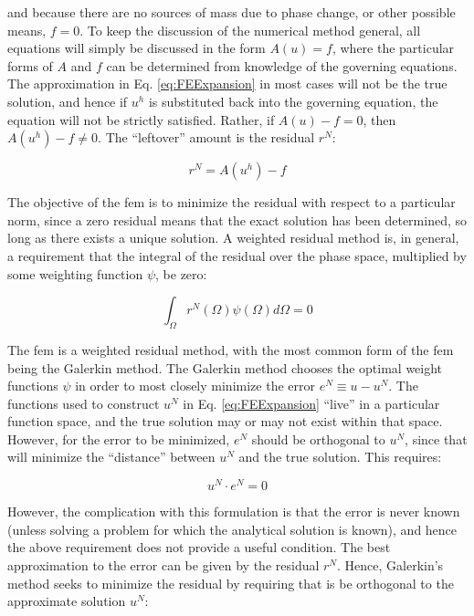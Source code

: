 \documentclass[10pt]{article}
\numberwithin{equation}{section} %
\begin{document}
and because there are no sources of mass due to phase change, or other possible means, \(f=0\). To keep the discussion of the numerical method general, all equations will simply be discussed in the form \(A(u)=f\), where the particular forms of \(A\) and \(f\) can be determined from knowledge of the governing equations. The approximation in Eq. \eqref{eq:FEExpansion} in most cases will not be the true solution, and hence if \(u^h\) is substituted back into the governing equation, the equation will not be strictly satisfied. Rather, if \(A(u)-f=0\), then \(A(u^h)-f\neq0\). The ``leftover'' amount is the residual \(r^N\):

\begin{equation}
\label{eq:residual}
r^N=A(u^h)-f
\end{equation}

The objective of the \gls{fem} is to minimize the residual with respect to a particular norm, since a zero residual means that the exact solution has been determined, so long as there exists a unique solution. A weighted residual method is, in general, a requirement that the integral of the residual over the phase space, multiplied by some weighting function \(\psi\), be zero:

\begin{equation}
\int_\Omega r^N(\Omega)\psi(\Omega)d\Omega=0
\end{equation}

The \gls{fem} is a weighted residual method, with the most common form of the \gls{fem} being the Galerkin method. The Galerkin method chooses the optimal weight functions \(\psi\) in order to most closely minimize the error \(e^N\equiv u-u^N\). The functions used to construct \(u^N\) in Eq. \eqref{eq:FEExpansion} ``live'' in a particular function space, and the true solution may or may not exist within that space. However, for the error to be minimized, \(e^N\) should be orthogonal to \(u^N\), since that will minimize the ``distance'' between \(u^N\) and the true solution. This requires:

\begin{equation}
u^N\cdot e^N=0
\end{equation}

However, the complication with this formulation is that the error is never known (unless solving a problem for which the analytical solution is known), and hence the above requirement does not provide a useful condition. The best approximation to the error can be given by the residual \(r^N\). Hence, Galerkin's method seeks to minimize the residual by requiring that is be orthogonal to the approximate solution \(u^N\):
\end{document}
